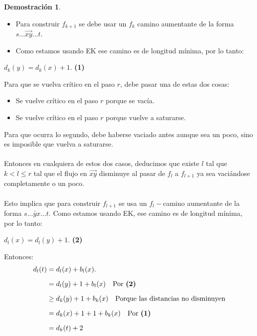 \documentclass[11pt, a4paper]{article}
\theoremstyle{definition}
\newtheorem*{demostracion}{Demostración}
\begin{document}
\begin{demostracion}
\begin{itemize}
            \begin{itemize}
                \item Para construir $f_{k+1}$ se debe usar un $f_k$ camino aumentante de la forma $s \ldots \overrightarrow{xy} \ldots t$.
                \item Como estamos usando EK ese camino es de longitud mínima, por lo tanto: 
            \end{itemize}
                \begin{center}
                    $d_k(y)=d_k(x)+1$. \textbf{(1)}
                \end{center}
            Para que se vuelva crítico en el paso $r$, debe pasar una de estas dos cosas:
            \begin{itemize}
                \item Se vuelve crítico en el paso $r$ porque se vacía.
                \item Se vuelve crítico en el paso $r$ porque vuelve a saturarse.
            \end{itemize}
            Para que ocurra lo segundo, debe haberse vaciado antes aunque sea un poco, sino es imposible que vuelva a saturarse.\\ \\
            Entonces en cualquiera de estos dos casos, deducimos que existe $l$ tal que $k<l\leq r$ tal que el flujo en $\overrightarrow{xy}$ 
            disminuye al pasar de $f_l$ a $f_{l+1}$ ya sea vaciándose completamente o un poco.\\ \\
            Esto implica que para construir $f_{l+1}$ se usa un $f_l-$camino aumentante de la forma $s \ldots \overleftarrow{yx} \ldots t$.
            Como estamos usando EK, ese camino es de longitud mínima, por lo tanto:
                \begin{center}
                    $d_l(x)=d_l(y)+1$. \textbf{(2)}
                \end{center}
            Entonces:
            \begin{align*}
                d_l(t) &= d_l(x) + b_l(x). \\[6pt]
                &= d_l(y) + 1 + b_l(x) \quad \text{Por \textbf{(2)}} \\[6pt]
                &\geq d_k(y) + 1 + b_k(x) \quad \text{Porque las distancias no disminuyen} \\[6pt]
                &= d_k(x) + 1 + 1 + b_k(x) \quad \text{Por \textbf{(1)}} \\[6pt]
                &= d_k(t) + 2
                \end{align*}
                

\end{itemize}
\end{demostracion}
\end{document}
